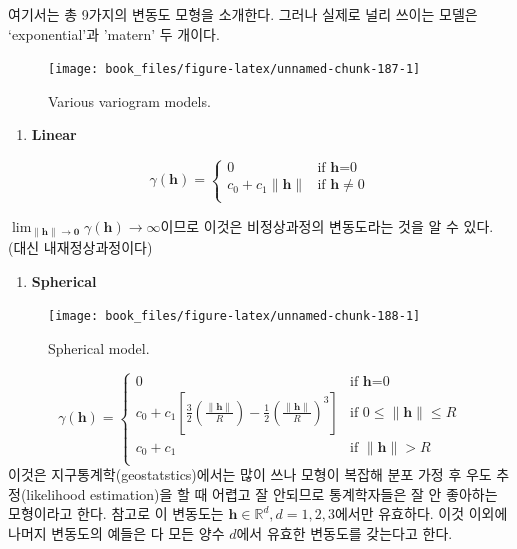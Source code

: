 \documentclass[b5paper,]{book}
\providecommand{\tightlist}{%
  \setlength{\itemsep}{0pt}\setlength{\parskip}{0pt}}
\theoremstyle{definition}
\theoremstyle{definition}
\theoremstyle{definition}
\theoremstyle{remark}
\begin{document}
여기서는 총 9가지의 변동도 모형을 소개한다. 그러나 실제로 널리 쓰이는
모델은 `exponential'과 'matern' 두 개이다.

\begin{figure}

{\centering \texttt{[image: book\_files/figure-latex/unnamed-chunk-187-1]} 

}

\caption{Various variogram models.}\label{fig:unnamed-chunk-187}
\end{figure}

\begin{enumerate}
\def\labelenumi{\arabic{enumi}.}
\tightlist
\item
  \textbf{Linear}
\end{enumerate}

\[
\gamma(\mathbf{h})= \left\{ \begin{array}{ll}
0 & \textrm{if $\mathbf{h}$=0}\\
c_{0}+c_{1}\| \mathbf{h}\| & \textrm{if $\mathbf{h}\neq 0$}\\
\end{array} \right.
\]

\(\lim_{\|\mathbf{h}\| \rightarrow \mathbf{0}}\gamma(\mathbf{h}) \rightarrow \infty\)이므로
이것은 비정상과정의 변동도라는 것을 알 수 있다. (대신 내재정상과정이다)

\begin{enumerate}
\def\labelenumi{\arabic{enumi}.}
\setcounter{enumi}{1}
\tightlist
\item
  \textbf{Spherical}
\end{enumerate}

\begin{figure}

{\centering \texttt{[image: book\_files/figure-latex/unnamed-chunk-188-1]} 

}

\caption{Spherical model.}\label{fig:unnamed-chunk-188}
\end{figure}

\[
\gamma(\mathbf{h})= \left\{ \begin{array}{ll}
0 & \textrm{if $\mathbf{h}$=0}\\
c_{0}+c_{1}[\frac{3}{2}(\frac{\| \mathbf{h}\|}{R})-\frac{1}{2}(\frac{\| \mathbf{h}\|}{R})^{3}] & \textrm{if $0 \leq \|\mathbf{h}\|\leq R$}\\
c_{0}+c_{1} & \textrm{if $\|\mathbf{h}\|>R$}\\
\end{array} \right.
\] 이것은 지구통계학(geostatstics)에서는 많이 쓰나 모형이 복잡해 분포
가정 후 우도 추정(likelihood estimation)을 할 때 어렵고 잘 안되므로
통계학자들은 잘 안 좋아하는 모형이라고 한다. 참고로 이 변동도는
\(\mathbf{h} \in \mathbb{R}^{d}, d=1,2,3\)에서만 유효하다. 이것 이외에
나머지 변동도의 예들은 다 모든 양수 \(d\)에서 유효한 변동도를 갖는다고
한다.
\end{document}

